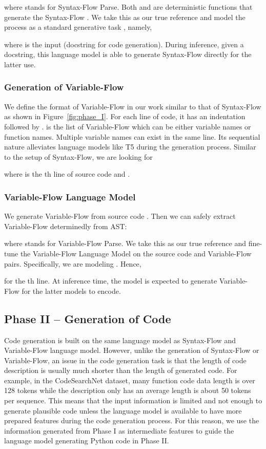 \documentclass[11pt]{article}
\begin{document}
where  stands for Syntax-Flow Parse. Both  and  are deterministic functions that generate the Syntax-Flow . We take this as our true reference and model the process as a standard generative task , namely, 


where  is the input (docstring for code generation). During inference, given a docstring, this language model is able to generate Syntax-Flow directly for the latter use. 

\subsubsection{Generation of Variable-Flow } 
We define the format of Variable-Flow in our work similar to that of Syntax-Flow as shown in Figure~\ref{fig:phase_I}. For each line of code, it has an indentation  followed by .  is the list of Variable-Flow which can be either variable names or function names. Multiple variable names can exist in the same line. Its sequential nature alleviates language models like T5 during the generation process. Similar to the setup of Syntax-Flow, we are looking for 


where  is the th line of source code and . 
\subsubsection{Variable-Flow Language Model}
We generate Variable-Flow from source code . Then we can safely extract Variable-Flow determinedly from AST:

where  stands for Variable-Flow Parse. We take this as our true reference and fine-tune the Variable-Flow Language Model on the source code and 
Variable-Flow pairs. Specifically, we are modeling . Hence,



for the th line. At inference time, the model is expected to generate Variable-Flow for the latter models to encode.





\subsection{Phase II -- Generation of Code}
Code generation is built on the same language model as Syntax-Flow and Variable-Flow language model. However, unlike the generation of Syntax-Flow or Variable-Flow, an issue in the code generation task is that the length of code description is usually much shorter than the length of generated code.
For example, in the CodeSearchNet dataset, many function code data length is over 128 tokens while the description only has an average length is about 50 tokens per sequence. This means that the input information is limited and not enough to generate plausible code unless the language model is available to have more prepared features during the code generation process.
For this reason, we use the information generated from Phase I as intermediate features to guide the language model generating Python code in Phase II.
\end{document}
